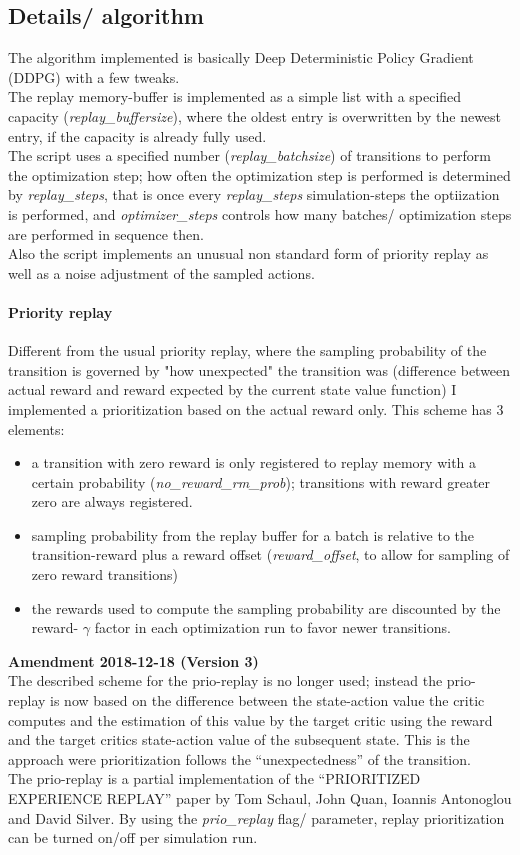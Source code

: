 \documentclass[a4paper]{article}
\begin{document}
\subsection{Details/ algorithm}
The algorithm implemented is basically Deep Deterministic Policy Gradient (DDPG)
with a few tweaks.
\\
The replay memory-buffer is implemented as a simple list with a specified capacity (\textit{replay\_buffersize}),
where the oldest entry is overwritten by the newest entry, if the capacity is already
fully used.
\\
The script uses a specified number (\textit{replay\_batchsize}) of transitions
to perform the optimization step; how often the optimization step is performed
is determined by \textit{replay\_steps}, that is once every \textit{replay\_steps}
simulation-steps the optiization is performed, and \textit{optimizer\_steps}
controls how many batches/ optimization steps are performed in sequence then.
\\
Also the script implements an unusual non standard form of priority replay
as well as a noise adjustment of the sampled actions.

\paragraph{Priority replay}
Different from the usual priority replay, where the sampling probability of the
transition is governed by "how unexpected" the transition was (difference between
actual reward and reward expected by the current state value function) I implemented
a prioritization based on the actual reward only. This scheme has 3 elements:
\begin{itemize}
\item a transition with zero reward is only registered to replay memory
with a certain probability (\textit{no\_reward\_rm\_prob});
transitions with reward greater zero are always registered.
\item sampling probability from the replay buffer for a batch is relative
to the transition-reward plus a reward offset (\textit{reward\_offset}, to allow
for sampling of zero reward transitions)
\item the rewards used to compute the sampling probability are discounted by
the reward- $\gamma$ factor in each optimization run to favor newer transitions.
\end{itemize}

\textbf{Amendment 2018-12-18 (Version 3)}\\
The described scheme for the prio-replay is no longer used; instead the prio-replay
is now based on the difference between the state-action value the critic
computes and the estimation of this value by the target critic using the reward
and the target critics state-action value of the subsequent state. This is the
approach were prioritization follows the \enquote{unexpectedness} of the transition.
\\
The prio-replay is a partial implementation of the \enquote{PRIORITIZED EXPERIENCE REPLAY}
paper by Tom Schaul, John Quan, Ioannis Antonoglou and David Silver.
By using the \textit{prio\_replay} flag/ parameter, replay prioritization can be
turned on/off per simulation run.
\end{document}
